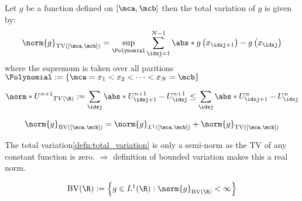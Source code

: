 \begin{defnbox}\nospacing
    \begin{defn}\label{defn:discrete_total_variation}
        Let $g$ be a function defined on $[\mca,\mcb]$ then the total variation of $g$ is given by:
        \begin{align}
          \norm{g}_{\text{TV}([\mca,\mcb])}=\sup_{\Polynomial}\sum_{\idxj=1}^{N-1}\abs*{g\left(x_{\idxj+1}\right)-g\left(x_{\idxj}\right)}
        \end{align}
        where the supremum is taken over all paritions $\Polynomial:=\left\{\mca=x_{1}<x_{2}<\cdots<x_{N}=\mcb\right\}$
    \end{defn}
\end{defnbox}
\begin{defnbox}\nospacing
    \begin{defn}\label{defn:discrete_total_variation_diminishing}
        \begin{align}
          \norm*{U^{n+1}}_{TV(\R)}:=\sum_{\idxj}\abs*{U_{\idxj+1}^{n+1}-U_{\idxj}^{n+1}}\leq \sum_{\idxj}\abs*{U_{\idxj+1}^{n}-U_{\idxj}^{n}}\label{eq:discrete_total_variation_diminishing}
        \end{align}
    \end{defn}
\end{defnbox}
\begin{defnbox}\nospacing
    \begin{defn}\label{defn:bounded_variation}
       \begin{align}
         \norm{g}_{\text{BV}([\mca,\mcb])}=\norm{g}_{L^1([\mca,\mcb])}+\norm{g}_{\text{TV}([\mca,\mcb])}
       \end{align}
    \end{defn}
\end{defnbox}
\begin{explanationbox}\nospacing
    \begin{explanation}
        The total variation\cref{defn:total_variation} is only a semi-norm as the TV of any constant function is zero.
        $\Rightarrow$ definition of bounded variation makes this a real norm.
    \end{explanation}
\end{explanationbox}
\begin{defnbox}\nospacing
    \begin{defn}\label{defn:bounded_variation_functionspace}
        \begin{align}
          \text{BV}(\R):=\left\{g\in L^{1}(\R): \norm{g}_{\text{BV}(\R)}<\infty\right\}
        \end{align}
    \end{defn}
\end{defnbox}


